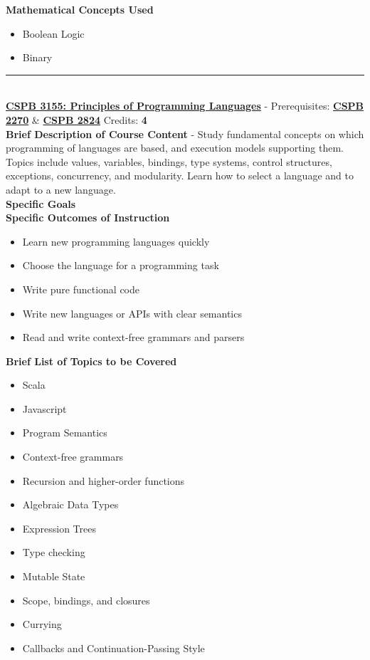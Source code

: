 \documentclass{article}
\newcommand{\horizontalline}{\noindent \rule{\textwidth}{0.5pt} \\}
\begin{document}
\noindent \textbf{Mathematical Concepts Used}
\begin{itemize}
    \item Boolean Logic
    \item Binary
\end{itemize}
\horizontalline
\noindent \href{https://www.colorado.edu/program/cspb/cspb-3155-principles-programming-languages}{\textbf{CSPB 3155: Principles of Programming Languages}} - Prerequisites: \href{https://www.colorado.edu/program/cspb/cspb-2270-computer-science-2-data-structures}{\textbf{CSPB 2270}} \& \href{https://www.colorado.edu/program/cspb/cspb-2824-discrete-structures}{\textbf{CSPB 2824}} Credits: \textbf{4} \\

\noindent \textbf{Brief Description of Course Content} - Study fundamental concepts on which programming of languages are based, and execution models supporting them. Topics include values, variables, bindings, type systems, control structures, exceptions, concurrency, and modularity. Learn how to select a language and to adapt to a new language. \\

\noindent \textbf{Specific Goals} \\

\noindent \textbf{Specific Outcomes of Instruction}
\begin{itemize}
    \item Learn new programming languages quickly
    \item Choose the language for a programming task
    \item Write pure functional code
    \item Write new languages or APIs with clear semantics
    \item Read and write context-free grammars and parsers
\end{itemize}

\noindent \textbf{Brief List of Topics to be Covered}
\begin{itemize}
    \item Scala
    \item Javascript
    \item Program Semantics
    \item Context-free grammars
    \item Recursion and higher-order functions
    \item Algebraic Data Types
    \item Expression Trees
    \item Type checking
    \item Mutable State
    \item Scope, bindings, and closures
    \item Currying
    \item Callbacks and Continuation-Passing Style
\end{itemize}
\end{document}
